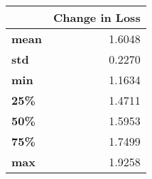\begin{tabular}{lr}
\toprule
{} &  Change in Loss \\
\midrule
\textbf{mean} &          1.6048 \\
\textbf{std } &          0.2270 \\
\textbf{min } &          1.1634 \\
\textbf{25\% } &          1.4711 \\
\textbf{50\% } &          1.5953 \\
\textbf{75\% } &          1.7499 \\
\textbf{max } &          1.9258 \\
\bottomrule
\end{tabular}
